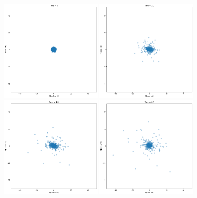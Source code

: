\documentclass[12pt]{article}
\begin{document}
    \begin{figure}[H]
        \centering 
        \includegraphics[width = 0.45\textwidth]{./LF/0.png} 
        \includegraphics[width = 0.45\textwidth]{./LF/2.png} 
        \includegraphics[width = 0.45\textwidth]{./LF/4.png} 
        \includegraphics[width = 0.45\textwidth]{./LF/6.png} 

\end{figure}
\end{document}
